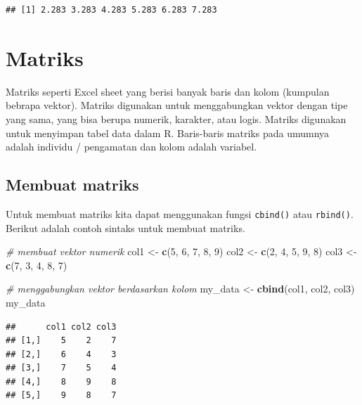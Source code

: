 \documentclass[
]{book}
\newenvironment{Shaded}{\begin{snugshade}}{\end{snugshade}}
\newcommand{\CommentTok}[1]{\textcolor[rgb]{0.56,0.35,0.01}{\textit{#1}}}
\newcommand{\DecValTok}[1]{\textcolor[rgb]{0.00,0.00,0.81}{#1}}
\newcommand{\FunctionTok}[1]{\textcolor[rgb]{0.13,0.29,0.53}{\textbf{#1}}}
\newcommand{\NormalTok}[1]{#1}
\newcommand{\OtherTok}[1]{\textcolor[rgb]{0.56,0.35,0.01}{#1}}
\theoremstyle{definition}
\theoremstyle{definition}
\theoremstyle{definition}
\theoremstyle{definition}
\theoremstyle{remark}
\begin{document}
\begin{verbatim}
## [1] 2.283 3.283 4.283 5.283 6.283 7.283
\end{verbatim}

\hypertarget{matriks}{%
\section{Matriks}\label{matriks}}

Matriks seperti Excel sheet yang berisi banyak baris dan kolom (kumpulan bebrapa vektor). Matriks digunakan untuk menggabungkan vektor dengan tipe yang sama, yang bisa berupa numerik, karakter, atau logis. Matriks digunakan untuk menyimpan tabel data dalam R. Baris-baris matriks pada umumnya adalah individu / pengamatan dan kolom adalah variabel.

\hypertarget{creatematrix}{%
\subsection{Membuat matriks}\label{creatematrix}}

Untuk membuat matriks kita dapat menggunakan fungsi \texttt{cbind()} atau \texttt{rbind()}. Berikut adalah contoh sintaks untuk membuat matriks.

\begin{Shaded}
\begin{Highlighting}[]
\CommentTok{\# membuat vektor numerik}
\NormalTok{col1 }\OtherTok{\textless{}{-}} \FunctionTok{c}\NormalTok{(}\DecValTok{5}\NormalTok{, }\DecValTok{6}\NormalTok{, }\DecValTok{7}\NormalTok{, }\DecValTok{8}\NormalTok{, }\DecValTok{9}\NormalTok{)}
\NormalTok{col2 }\OtherTok{\textless{}{-}} \FunctionTok{c}\NormalTok{(}\DecValTok{2}\NormalTok{, }\DecValTok{4}\NormalTok{, }\DecValTok{5}\NormalTok{, }\DecValTok{9}\NormalTok{, }\DecValTok{8}\NormalTok{)}
\NormalTok{col3 }\OtherTok{\textless{}{-}} \FunctionTok{c}\NormalTok{(}\DecValTok{7}\NormalTok{, }\DecValTok{3}\NormalTok{, }\DecValTok{4}\NormalTok{, }\DecValTok{8}\NormalTok{, }\DecValTok{7}\NormalTok{)}

\CommentTok{\# menggabungkan vektor berdasarkan kolom}
\NormalTok{my\_data }\OtherTok{\textless{}{-}} \FunctionTok{cbind}\NormalTok{(col1, col2, col3)}
\NormalTok{my\_data}
\end{Highlighting}
\end{Shaded}

\begin{verbatim}
##      col1 col2 col3
## [1,]    5    2    7
## [2,]    6    4    3
## [3,]    7    5    4
## [4,]    8    9    8
## [5,]    9    8    7
\end{verbatim}
\end{document}
